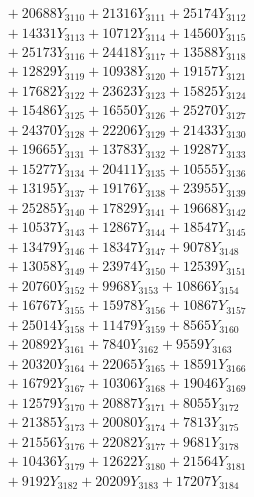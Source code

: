 \documentclass[a4paper,10pt]{article}
\begin{document}
{\begin{align}
&\;  + 20688 Y_{3110} + 21316 Y_{3111} + 25174 Y_{3112} \\[0.3ex]
&\;  + 14331 Y_{3113} + 10712 Y_{3114} + 14560 Y_{3115} \\[0.3ex]
&\;  + 25173 Y_{3116} + 24418 Y_{3117} + 13588 Y_{3118} \\[0.5ex]\allowbreak
&\;  + 12829 Y_{3119} + 10938 Y_{3120} + 19157 Y_{3121} \\[0.3ex]
&\;  + 17682 Y_{3122} + 23623 Y_{3123} + 15825 Y_{3124} \\[0.3ex]
&\;  + 15486 Y_{3125} + 16550 Y_{3126} + 25270 Y_{3127} \\[0.3ex]
&\;  + 24370 Y_{3128} + 22206 Y_{3129} + 21433 Y_{3130} \\[0.3ex]
&\;  + 19665 Y_{3131} + 13783 Y_{3132} + 19287 Y_{3133} \\[0.3ex]
&\;  + 15277 Y_{3134} + 20411 Y_{3135} + 10555 Y_{3136} \\[0.3ex]
&\;  + 13195 Y_{3137} + 19176 Y_{3138} + 23955 Y_{3139} \\[0.3ex]
&\;  + 25285 Y_{3140} + 17829 Y_{3141} + 19668 Y_{3142} \\[0.3ex]
&\;  + 10537 Y_{3143} + 12867 Y_{3144} + 18547 Y_{3145} \\[0.3ex]
&\;  + 13479 Y_{3146} + 18347 Y_{3147} + 9078 Y_{3148} \\[0.5ex]\allowbreak
&\;  + 13058 Y_{3149} + 23974 Y_{3150} + 12539 Y_{3151} \\[0.3ex]
&\;  + 20760 Y_{3152} + 9968 Y_{3153} + 10866 Y_{3154} \\[0.3ex]
&\;  + 16767 Y_{3155} + 15978 Y_{3156} + 10867 Y_{3157} \\[0.3ex]
&\;  + 25014 Y_{3158} + 11479 Y_{3159} + 8565 Y_{3160} \\[0.3ex]
&\;  + 20892 Y_{3161} + 7840 Y_{3162} + 9559 Y_{3163} \\[0.3ex]
&\;  + 20320 Y_{3164} + 22065 Y_{3165} + 18591 Y_{3166} \\[0.3ex]
&\;  + 16792 Y_{3167} + 10306 Y_{3168} + 19046 Y_{3169} \\[0.3ex]
&\;  + 12579 Y_{3170} + 20887 Y_{3171} + 8055 Y_{3172} \\[0.3ex]
&\;  + 21385 Y_{3173} + 20080 Y_{3174} + 7813 Y_{3175} \\[0.3ex]
&\;  + 21556 Y_{3176} + 22082 Y_{3177} + 9681 Y_{3178} \\[0.5ex]\allowbreak
&\;  + 10436 Y_{3179} + 12622 Y_{3180} + 21564 Y_{3181} \\[0.3ex]
&\;  + 9192 Y_{3182} + 20209 Y_{3183} + 17207 Y_{3184} \\[0.3ex]

\end{align}}
\end{document}
